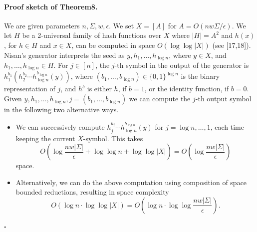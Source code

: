 \documentclass[10pt,a4paper]{article}
\begin{document}
\paragraph{Proof sketch of Theorem8.}
We are given parameters $n,\Sigma,w,\epsilon$. We set $X=[A]$ for $A=O(nw\Sigma/\epsilon)$. We let $H$ be a 2-universal family of hash functions over $X$ where $|H|=A^2$ and $h(x)$, for $h\in H$ and $x\in X$, can be computed in space $O(\log\log|X|)$ (see [17,18]).
Nisan's generator interprets the seed as $y,h_1,\ldots,h_{\log n}$, where $y\in X$, and $h_1,\ldots,h_{\log n}\in H$. For $j\in[n]$, the $j$-th symbol in the output of the generator is $h_1^{b_1}(h_2^{b_2}\cdots h_{\log n}^{b_{\log n}}(y))$, where $(b_1,\ldots,b_{\log n})\in\{0,1\}^{\log n}$ is the binary representation of $j$, and $h^b$ is either $h$, if $b=1$, or the identity function, if $b=0$. Given $y,h_1,\ldots,h_{\log n},j=(b_1,\ldots,b_{\log n})$ we can compute the $j$-th output symbol in the following two alternative ways.
\begin{itemize}
\item We can successively compute $h_j^{b_j}\cdots h_{\log n}^{b_{\log n}}(y)$ for $j=\log n,\ldots,1$, each time keeping the current $X$-symbol. This takes
\[O\left(\log\frac{nw|\Sigma|}\epsilon+\log\log n+\log\log|X|\right)=O\left(\log\frac{nw|\Sigma|}\epsilon\right)\]
space.
\item Alternatively, we can do the above computation using composition of space bounded reductions, resulting in space complexity
\[O(\log n\cdot\log\log|X|)=O\left(\log n\cdot\log\log\frac{nw|\Sigma|}\epsilon\right).\]
\end{itemize}
\hfill$\square$
\end{document}
